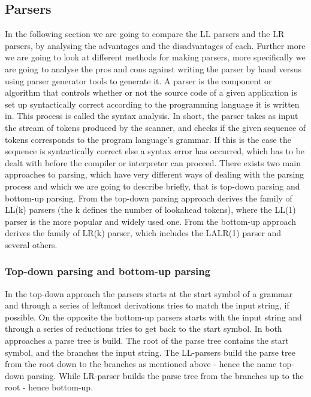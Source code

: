 \subsection{Parsers}
\label{sec:parsers}

In the following section we are going to compare the LL parsers and the LR parsers, by analysing the advantages and the disadvantages of each. Further more we are going to look at different methods for making parsers, more specifically we are going to analyse the pros and cons against writing the parser by hand versus using parser generator tools to generate it. A parser is the component or algorithm that controls whether or not the source code of a given application is set up syntactically correct according to the programming language it is written in. This process is called the syntax analysis. In short, the parser takes as input the stream of tokens produced by the scanner, and checks if the given sequence of tokens corresponds to the program language's grammar. If this is the case the sequence is syntactically correct else a syntax error has occurred, which has to be dealt with before the compiler or interpreter can proceed. There exists two main approaches to parsing, which have very different ways of dealing with the parsing process and which we are going to describe briefly, that is top-down parsing and bottom-up parsing. From the top-down parsing approach derives the family of LL(k) parsers (the k defines the number of lookahead tokens), where the LL(1) parser is the more popular and widely used one. From the bottom-up approach derives the family of LR(k) parser, which includes the LALR(1) parser and several others.

\subsubsection{Top-down parsing and bottom-up parsing}

In the top-down approach the parsers starts at the start symbol of a grammar and through a series of leftmost derivations tries to match the input string, if possible. On the opposite the bottom-up parsers starts with the input string and through a series of reductions tries to get back to the start symbol. In both approaches a parse tree is build. The root of the parse tree contains the start symbol, and the branches the input string. The LL-parsers
build the parse tree from the root down to the branches as mentioned above - hence the name top-down parsing. While LR-parser builds the parse tree from the branches up to the root - hence bottom-up.

